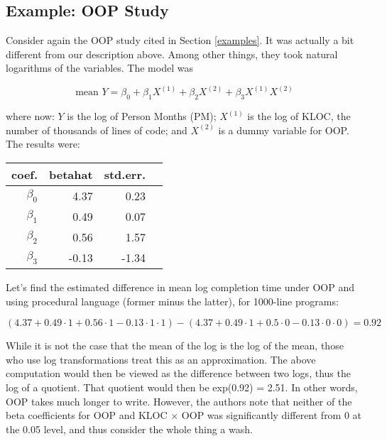 \subsection{Example:  OOP Study}

Consider again the OOP study cited in Section \ref{examples}.  It was
actually a bit different from our description above.  Among other
things, they took natural logarithms of the variables.  The model was

\begin{equation}
\label{oopmodel}
\textrm{mean } Y =
\beta_0 +
\beta_1 X^{(1)} +
\beta_2 X^{(2)} +
\beta_3 X^{(1)} X^{(2)}
\end{equation}

where now:  $Y$ is the log of Person Months (PM); $X^{(1)}$ is the log of
KLOC, the number of thousands of lines of code; and $ X^{(2)}$ is a dummy
variable for OOP.  The results were:

\begin{tabular}{|r|r|r|r|}
\hline
coef. & betahat & std.err. \\ \hline
$\beta_0$ & 4.37 & 0.23 \\ \hline
$\beta_1$ & 0.49 & 0.07 \\ \hline
$\beta_2$ & 0.56 & 1.57 \\ \hline
$\beta_3$ & -0.13 & -1.34 \\ \hline
\end{tabular}

Let's find the estimated difference in mean log completion time
under OOP and using procedural language  (former minus the latter), for
1000-line programs:

\begin{equation}
(4.37 + 0.49 \cdot 1 + 0.56 \cdot 1 - 0.13 \cdot 1 \cdot 1) -
(4.37 + 0.49 \cdot 1 + 0.5 \cdot 0 - 0.13 \cdot 0 \cdot 0) = 0.92
\end{equation}

While it is not the case that the mean of the log is the log of the
mean, those who use log transformations treat this as an approximation.
The above computation would then be viewed as the difference between two
logs, thus the log of a quotient.  That quotient would then be exp(0.92)
= 2.51.  In other words, OOP takes much longer to write.  However, the
authors note that neither of the beta coefficients for OOP and KLOC
$\times$ OOP was significantly different from 0 at the 0.05 level, and
thus consider the whole thing a wash.

\startproblemset

